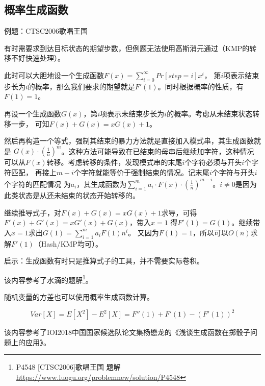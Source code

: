 \subsection{概率生成函数}
例题：CTSC2006歌唱王国

有时需要求到达目标状态的期望步数，但例题无法使用高斯消元通过（KMP的转移不好快速处理）。

此时可以大胆地设一个生成函数$F(x)=\displaystyle \sum_{i=0}^\infty{Pr[step=i]x^i}$，
第$i$项表示结束步长为$i$的概率，那么我们要求的期望就是$F'(1)$。同时根据概率的性质，有
$F(1)=1$。

再设一个生成函数$G(x)$，第$i$项表示未结束步长为$i$的概率。考虑从未结束状态转移一步，
可知$F(x)+G(x)=xG(x)+1$。

然后再构造一个等式，强制其结束的暴力方法就是直接加入模式串，其生成函数就是
$G(x)\cdot (\frac{1}{n})^m$。这种方法可能导致在已结束的母串后继续加字符，这种情况
可以从$F(x)$转移。考虑转移的条件，发现模式串的末尾$i$个字符必须与开头$i$个字符匹配，
再接上$m-i$个字符就能等价于强制结束的情况。记末尾$i$个字符与开头$i$个字符的匹配情况
为$a_i$，其生成函数为$\displaystyle \sum_{i=1}^m{a_i\cdot F(x)\cdot
 (\frac{1}{n})^{m-i}}$。$i\neq 0$是因为此类状态是从还未结束的状态开始转移的。

继续推导式子，对$F(x)+G(x)=xG(x)+1$求导，可得$F'(x)+G'(x)=xG'(x)+G(x)$，带入$x=1$
得$F'(1)=G(1)$。继续带入$x=1$求出$G(1)=\displaystyle \sum_{i=1}^m{a_iF(1)n^i}$。
又因为$F(1)=1$，所以可以$O(n)$求解$F'(1)$（Hash/KMP均可）。

启示：生成函数有时只是推算式子的工具，并不需要实际卷积。

该内容参考了水滴的题解\footnote{
	P4548 [CTSC2006]歌唱王国 题解\\
	\url{https://www.luogu.org/problemnew/solution/P4548}
}。

随机变量的方差也可以使用概率生成函数计算。

\begin{displaymath}
	Var[X]=E[X^2]-E^2[X]=F''(1)+F'(1)-(F'(1))^2
\end{displaymath}

该内容参考了IOI2018中国国家候选队论文集杨懋龙的《浅谈生成函数在掷骰子问题上的应用》。
